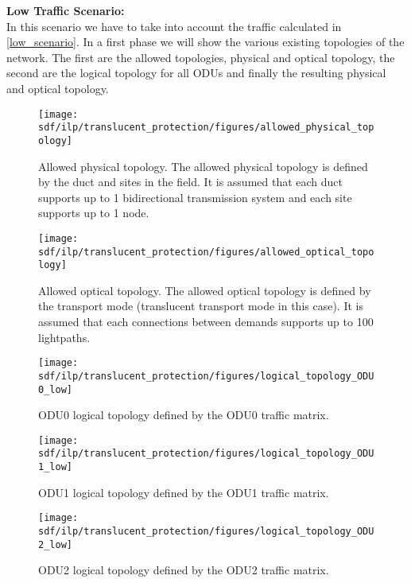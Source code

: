 \textbf{Low Traffic Scenario:}\\

In this scenario we have to take into account the traffic calculated in \ref{low_scenario}. In a first phase we will show the various existing topologies of the network. The first are the allowed topologies, physical and optical topology, the second are the logical topology for all ODUs and finally the resulting physical and optical topology.\\

\newpage
\begin{figure}[h!]
\centering
\texttt{[image: sdf/ilp/translucent\_protection/figures/allowed\_physical\_topology]}
\caption{Allowed physical topology. The allowed physical topology is defined by the duct and sites in the field. It is assumed that each duct supports up to 1 bidirectional transmission system and each site supports up to 1 node.}
\label{allowed3_physical_protectionlow}
\end{figure}

\vspace{20pt}
\begin{figure}[h!]
\centering
\texttt{[image: sdf/ilp/translucent\_protection/figures/allowed\_optical\_topology]}
\caption{Allowed optical topology. The allowed optical topology is defined by the transport mode (translucent transport mode in this case). It is assumed that each connections between demands supports up to 100 lightpaths.}
\label{allowed3_optical_protectionlow}
\end{figure}

\newpage
\begin{figure}[h!]
\centering
\texttt{[image: sdf/ilp/translucent\_protection/figures/logical\_topology\_ODU0\_low]}
\caption{ODU0 logical topology defined by the ODU0 traffic matrix.}
\label{logical3_ODU0_protectionlow}
\end{figure}

\begin{figure}[h!]
\centering
\texttt{[image: sdf/ilp/translucent\_protection/figures/logical\_topology\_ODU1\_low]}
\caption{ODU1 logical topology defined by the ODU1 traffic matrix.}
\label{logical3_ODU1_protectionlow}
\end{figure}

\begin{figure}[h!]
\centering
\texttt{[image: sdf/ilp/translucent\_protection/figures/logical\_topology\_ODU2\_low]}
\caption{ODU2 logical topology defined by the ODU2 traffic matrix.}
\label{logical3_ODU2_protectionlow}
\end{figure}

